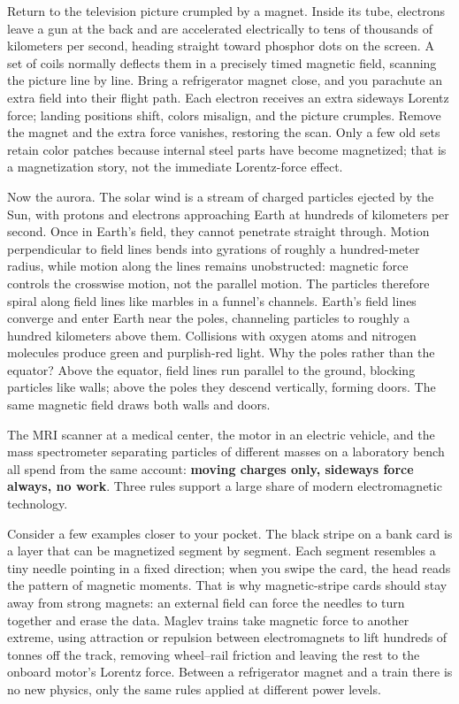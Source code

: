 
\begin{mainline}
Return to the television picture crumpled by a magnet. Inside its tube, electrons leave a gun at the back and are accelerated electrically to tens of thousands of kilometers per second, heading straight toward phosphor dots on the screen. A set of coils normally deflects them in a precisely timed magnetic field, scanning the picture line by line. Bring a refrigerator magnet close, and you parachute an extra field into their flight path. Each electron receives an extra sideways Lorentz force; landing positions shift, colors misalign, and the picture crumples. Remove the magnet and the extra force vanishes, restoring the scan. Only a few old sets retain color patches because internal steel parts have become magnetized; that is a magnetization story, not the immediate Lorentz-force effect.

Now the aurora. The solar wind is a stream of charged particles ejected by the Sun, with protons and electrons approaching Earth at hundreds of kilometers per second. Once in Earth's field, they cannot penetrate straight through. Motion perpendicular to field lines bends into gyrations of roughly a hundred-meter radius, while motion along the lines remains unobstructed: magnetic force controls the crosswise motion, not the parallel motion. The particles therefore spiral along field lines like marbles in a funnel's channels. Earth's field lines converge and enter Earth near the poles, channeling particles to roughly a hundred kilometers above them. Collisions with oxygen atoms and nitrogen molecules produce green and purplish-red light. Why the poles rather than the equator? Above the equator, field lines run parallel to the ground, blocking particles like walls; above the poles they descend vertically, forming doors. The same magnetic field draws both walls and doors.

The MRI scanner at a medical center, the motor in an electric vehicle, and the mass spectrometer separating particles of different masses on a laboratory bench all spend from the same account: \textbf{moving charges only, sideways force always, no work}. Three rules support a large share of modern electromagnetic technology.

Consider a few examples closer to your pocket. The black stripe on a bank card is a layer that can be magnetized segment by segment. Each segment resembles a tiny needle pointing in a fixed direction; when you swipe the card, the head reads the pattern of magnetic moments. That is why magnetic-stripe cards should stay away from strong magnets: an external field can force the needles to turn together and erase the data. Maglev trains take magnetic force to another extreme, using attraction or repulsion between electromagnets to lift hundreds of tonnes off the track, removing wheel--rail friction and leaving the rest to the onboard motor's Lorentz force. Between a refrigerator magnet and a train there is no new physics, only the same rules applied at different power levels.
\end{mainline}


